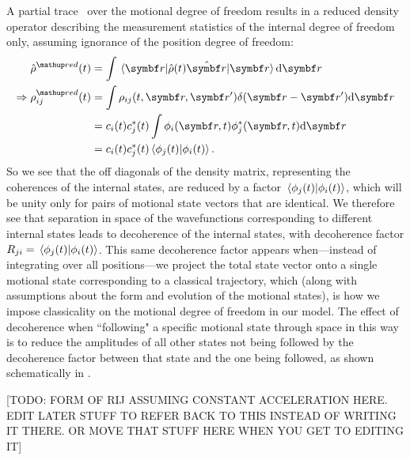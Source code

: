 A partial trace~\cite{schlosshauer_decoherence:_2007} over the motional degree of freedom results in a reduced density operator describing the measurement statistics of the internal degree of freedom only, assuming ignorance of the position degree of freedom:
\begin{align}
\hat\rho^\up{red}(t) &= \int\matrixel{\vec r}{\hat \rho(t) \hat {\vec r}}{\vec r}\dd \vec r\\
\Rightarrow \rho^\up{red}_{ij}(t) &= \int\rho_{ij}(t, \vec r, \vec r^\prime)\delta(\vec r - \vec r^\prime)\dd \vec r\\
&= c_i(t) c_j^*(t)\int\phi_i(\vec r, t)\phi_j^*(\vec r, t)\dd \vec r\\
&= c_i(t) c_j^*(t)\braket{\phi_j(t)}{\phi_i(t)}.
\end{align}
So we see that the off diagonals of the density matrix, representing the coherences of the internal states, are reduced by a factor $\braket{\phi_j(t)}{\phi_i(t)}$, which will be unity only for pairs of motional state vectors that are identical. We therefore see that separation in space of the wavefunctions corresponding to different internal states leads to decoherence of the internal states, with decoherence factor $R_{ji} = \braket{\phi_j(t)}{\phi_i(t)}$. This same decoherence factor appears when---instead of integrating over all positions---we project the total state vector onto a single motional state corresponding to a classical trajectory, which (along with assumptions about the form and evolution of the motional states), is how we impose classicality on the motional degree of freedom in our model. The effect of decoherence when ``following" a specific motional state through space in this way is to reduce the amplitudes of all other states not being followed by the decoherence factor between that state and the one being followed, as shown schematically in .

[TODO: FORM OF RIJ ASSUMING CONSTANT ACCELERATION HERE. EDIT LATER STUFF TO REFER BACK TO THIS INSTEAD OF WRITING IT THERE. OR MOVE THAT STUFF HERE WHEN YOU GET TO EDITING IT]

